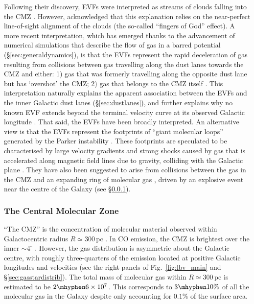 Following their discovery, EVFs were interpreted as streams of clouds falling into the CMZ \citep{Stark1986, Boyce1989, Baba2010}. However, \citet{Stark1986} acknowledged that this explanation relies on the near-perfect line-of-sight alignment of the clouds (the so-called ``fingers of God'' effect). A more recent interpretation, which has emerged thanks to the advancement of numerical simulations that describe the flow of gas in a barred potential (\S\ref{sec:generaldynamics}), is that the EVFs represent the rapid deceleration of gas resulting from collisions between gas travelling along the dust lanes towards the CMZ and either: 1) gas that was formerly travelling along the opposite dust lane but has `overshot' the CMZ; 2) gas that belongs to the CMZ itself \citep{Fux1999, Liszt2006, Liszt2008, Rodriguez-Fernandez2008, Bally2010, Sormani2019a, Akhter2021}. This interpretation naturally explains the apparent association between the EVFs and the inner Galactic dust lanes (\S\ref{sec:dustlanes}), and further explains why no known EVF extends beyond the terminal velocity curve at its observed Galactic longitude \citep{Sormani2019a}. That said, the EVFs have been broadly interpreted.  An alternative view is that the EVFs represent the footprints of ``giant molecular loops'' generated by the Parker instability \citep{Parker1966}. These footprints are speculated to be characterised by large velocity gradients and strong shocks caused by gas that is accelerated along magnetic field lines due to gravity, colliding with the Galactic plane \citep{Fukui2006, Fujishita2009, Machida2009, Torii2010, Kakiuchi2018, Riquelme2018, Enokiya2021}. They have also been suggested to arise from collisions between the gas in the CMZ and an expanding ring of molecular gas \citep{Uchida1994,Oka2020}, driven by an explosive event near the centre of the Galaxy (see \S\ref{sec:cmz}). 

\subsubsection{The Central Molecular Zone}\label{sec:cmz}

``The CMZ'' is the concentration of molecular material observed within Galactocentric radius $R\simeq300$\,pc \citep[][]{Morris1996}. In CO emission, the CMZ is brightest over the inner $\sim4^{\circ}$ \citep{Bally1988, Oka1998b, Eden2020}. However, the gas distribution is asymmetric about the Galactic centre, with roughly three-quarters of the emission located at positive Galactic longitudes and velocities (see the right panels of Fig.~\ref{fig:lbv_main} and \S\ref{sec:gasstardistrib}). The total mass of molecular gas within $R\simeq300$\,pc is estimated to be $2\mhyphen6\times10^{7}$\,\msun \citep{Dahmen1998, Ferriere2007}. This corresponds to $3\mhyphen10\%$ of all the molecular gas in the Galaxy \citep[$6.5\times10^{8}$\,\msun; ][]{Roman-Duval2016} despite only accounting for $0.1\%$ of the surface area. 


